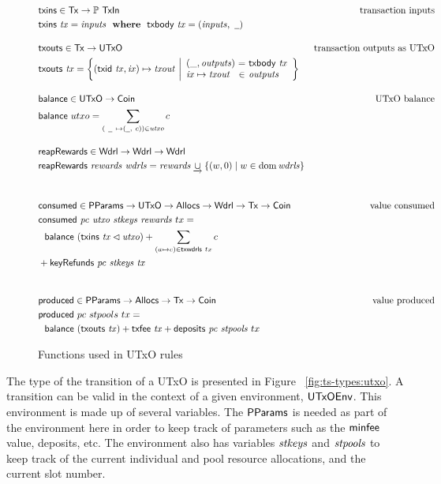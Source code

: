 \documentclass[11pt,a4paper,dvipsnames]{article}
\newcommand{\Tx}{\type{Tx}}
\newcommand{\UTxO}{\type{UTxO}}
\newcommand{\Wdrl}{\type{Wdrl}}
\newcommand{\Coin}{\type{Coin}}
\newcommand{\PParams}{\type{PParams}}
\newcommand{\Allocs}{\type{Allocs}}
\newcommand{\TxIn}{\type{TxIn}}
\newcommand{\UTxOEnv}{\type{UTxOEnv}}
\newcommand{\txins}[1]{\fun{txins}~ \var{#1}}
\newcommand{\txouts}[1]{\fun{txouts}~ \var{#1}}
\newcommand{\balance}[1]{\fun{balance}~ \var{#1}}
\newcommand{\deposits}[2]{\fun{deposits}~ \var{#1} ~ \var{#2}}
\newcommand{\keyRefunds}[3]{\fun{keyRefunds}~ \var{#1}~ \var{#2}~ \var{#3}}
\newcommand{\consumed}[4]{\fun{consumed}~ \var{#1}~ \var{#2}~ \var{#3}~ \var{#4}}
\newcommand{\txbody}[1]{\fun{txbody}~ \var{#1}}
\newcommand{\txfee}[1]{\fun{txfee}~ \var{#1}}
\newcommand{\wcard}[0]{\underline{\phantom{a}}}
\theoremstyle{definition}
\theoremstyle{definition}
\begin{document}
\begin{figure}
  \begin{align*}
    & \fun{txins} \in \Tx \to \powerset{\TxIn}
    & \text{transaction inputs} \\
    & \txins{tx} = \var{inputs} \where \txbody{tx} = (\var{inputs}, ~\wcard)
    \nextdef
    & \fun{txouts} \in \Tx \to \UTxO
    & \text{transaction outputs as UTxO} \\
    & \fun{txouts} ~ \var{tx} =
      \left\{ (\fun{txid} ~ \var{tx}, \var{ix}) \mapsto \var{txout} ~
      \middle| \begin{array}{l@{~}c@{~}l}
                 (\_, \var{outputs}) & = & \txbody{tx} \\
                 \var{ix} \mapsto \var{txout} & \in & \var{outputs}
               \end{array}
      \right\}
    \nextdef
    & \fun{balance} \in \UTxO \to \Coin
    & \text{UTxO balance} \\
    & \fun{balance} ~ utxo = \sum_{(~\wcard ~ \mapsto (\wcard, ~c)) \in \var{utxo}} c
    \nextdef
    & \fun{reapRewards} \in \Wdrl \to \Wdrl \to \Wdrl \\
        & \fun{reapRewards}~\var{rewards}~\var{wdrls} =
         \var{rewards} \unionoverrideRight \{(w, 0) \mid w \in \dom \var{wdrls}\} \\
    \nextdef
    & \fun{consumed} \in \PParams \to \UTxO \to \Allocs \to \Wdrl \to \Tx \to \Coin
    & \text{value consumed} \\
    & \consumed{pc}{utxo}{stkeys}{rewards}~{tx} = \\
    & ~~\balance{(\txins{tx} \restrictdom \var{utxo})} +
        \sum_{(a \mapsto c) \in \fun{txwdrls}~{tx}} c  \\
        & + \keyRefunds{pc}{stkeys}{tx} \\
    \nextdef
    & \fun{produced} \in \PParams \to \Allocs \to \Tx \to \Coin
    & \text{value produced} \\
    & \fun{produced} ~ pc ~ stpools ~ tx = \\
    &~~\balance{(\txouts{tx})}
     + \txfee{tx} + \deposits{pc}{stpools}~{tx}\\
  \end{align*}

  \caption{Functions used in UTxO rules}
  \label{fig:derived-defs:utxo}
\end{figure}


The type of the transition of a UTxO is presented in Figure
~\ref{fig:ts-types:utxo}. A
transition can be valid in the context of a given environment, $\UTxOEnv$.
This environment is made up of several variables.
The $\PParams$ is needed as part of the environment here in order to
keep track of parameters such as the $\mathsf{minfee}$ value, deposits, etc.
The environment also has variables $\mathit{stkeys}$ and $\mathit{stpools}$
to keep track of the current individual and pool resource allocations,
and the current slot number.
\end{document}
